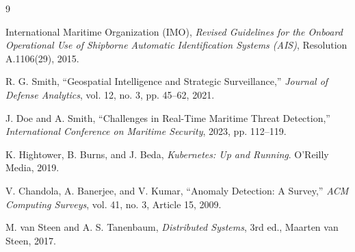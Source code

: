 \documentclass[11pt,a4paper]{article}
\begin{document}
\begin{thebibliography}{9}

International Maritime Organization (IMO), \textit{Revised Guidelines for the Onboard Operational Use of Shipborne Automatic Identification Systems (AIS)}, Resolution A.1106(29), 2015.

R. G. Smith, ``Geospatial Intelligence and Strategic Surveillance,'' \textit{Journal of Defense Analytics}, vol. 12, no. 3, pp. 45--62, 2021.

J. Doe and A. Smith, ``Challenges in Real-Time Maritime Threat Detection,'' \textit{International Conference on Maritime Security}, 2023, pp. 112--119.

K. Hightower, B. Burns, and J. Beda, \textit{Kubernetes: Up and Running}. O'Reilly Media, 2019.

V. Chandola, A. Banerjee, and V. Kumar, ``Anomaly Detection: A Survey,'' \textit{ACM Computing Surveys}, vol. 41, no. 3, Article 15, 2009.

M. van Steen and A. S. Tanenbaum, \textit{Distributed Systems}, 3rd ed., Maarten van Steen, 2017.

\end{thebibliography}
\end{document}
